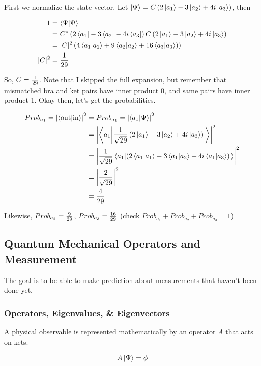 \documentclass[english, 11pt]{article}
\begin{document}
      First we normalize the state vector. Let $\left|\Psi\right\rangle = C \left( 2\left|a_1\right\rangle - 3\left|a_2\right\rangle + 4i\left|a_3\right\rangle \right)$, then

      \begin{align*}
        1 & = \braket{\Psi}{\Psi} \\
          & = C^* \left( 2\bra{a_1} - 3\bra{a_2} - 4i\bra{a_3} \right) C \left( 2\ket{a_1} - 3\ket{a_2} + 4i\ket{a_3} \right) \\
          & = |C|^2 \left( 4\braket{a_1}{a_1} + 9\braket{a_2}{a_2} + 16\braket{a_3}{a_3}) \right) \\
          |C|^2 & = \f{1}{29}
      \end{align*}

      So, $C = \frac{1}{29}$. Note that I skipped the full expansion, but remember that mismatched bra and ket pairs have inner product 0, and same pairs have inner product 1. Okay then, let's get the probabilities.

      \begin{align*}
         Prob_{a_1} = \left| \braket{\mbox{out}}{\mbox{in}} \right|^2 & = Prob_{a_1} = \left| \braket{a_1}{\Psi} \right|^2 \\
         & = \left| \braket{a_1}{\f{1}{\sqrt{29}}\left( 2\ket{a_1} - 3\ket{a_2} + 4i\ket{a_3} \right)} \right|^2 \\
         & = \left| \f{1}{\sqrt{29}} \braket{a_1}{\left( 2\braket{a_1}{a_1} - 3\braket{a_1}{a_2} + 4i\braket{a_1}{a_3} \right)} \right|^2 \\
         & = \left| \f{2}{\sqrt{29}} \right|^2 \\
         & = \f{4}{29}
      \end{align*}

      Likewise, $Prob_{a_2} = \frac{9}{29}$, $Prob_{a_3} = \frac{16}{29}$ (check $Prob_{a_1} + Prob_{a_2} + Prob_{a_3} = 1$)

    \subsection{Quantum Mechanical Operators and Measurement}

      The goal is to be able to make prediction about measurements that haven't been done yet.

      \subsubsection{Operators, Eigenvalues, \& Eigenvectors}

        \begin{defn}[Postulate 2]\label{postulate_2}
          A physical observable is represented mathematically by an operator $A$ that acts on kets.

          \[ A\left|\Psi\right\rangle = \phi \]
        \end{defn}
\end{document}
